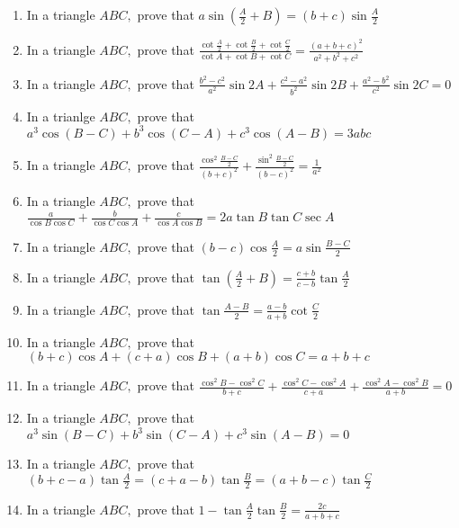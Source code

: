 \begin{enumerate}
\item In a triangle $ABC,$ prove that $a\sin\left(\frac{A}{2} + B\right) = (b + c)\sin\frac{A}{2}$

\item In a triangle $ABC,$ prove that $\frac{\cot\frac{A}{2} + \cot\frac{B}{2} + \cot\frac{C}{2}}{\cot A + \cot B + \cot
    C} = \frac{(a + b + c)^2}{a^2 + b^2 + c^2}$

\item In a triangle $ABC,$ prove that $\frac{b^2 - c^2}{a^2}\sin2A + \frac{c^2 - a^2}{b^2}\sin2B + \frac{a^2 -
    b^2}{c^2}\sin2C = 0$

\item In a trianlge $ABC,$ prove that $a^3\cos(B - C) + b^3\cos(C - A) + c^3\cos(A - B) = 3abc$

\item In a triangle $ABC,$ prove that $\frac{\cos^2\frac{B - C}{2}}{(b + c)^2} + \frac{\sin^2\frac{B - C}{2}}{(b - c)^2}
    = \frac{1}{a^2}$

\item In a triangle $ABC,$ prove that $\frac{a}{\cos B\cos C} + \frac{b}{\cos C\cos A} + \frac{c}{\cos A\cos B} = 2a\tan
    B\tan C\sec A$

\item In a triangle $ABC,$ prove that $(b - c)\cos\frac{A}{2} = a\sin\frac{B - C}{2}$

\item In a triangle $ABC,$ prove that $\tan\left(\frac{A}{2} + B\right) = \frac{c + b}{c - b}\tan \frac{A}{2}$

\item In a triangle $ABC,$ prove that $\tan\frac{A - B}{2} = \frac{a - b}{a + b}\cot\frac{C}{2}$

\item In a triangle $ABC,$ prove that $(b + c)\cos A + (c + a)\cos B + (a + b)\cos C = a + b + c$

\item In a triangle $ABC,$ prove that $\frac{\cos^2B - \cos^2C}{b + c} + \frac{\cos^2C - \cos^2A}{c + a} +
    \frac{\cos^2A - \cos^2B}{a + b} = 0$

\item In a triangle $ABC,$ prove that $a^3\sin(B - C) + b^3\sin(C - A) + c^3\sin(A - B) = 0$

\item In a triangle $ABC,$ prove that $(b + c - a)\tan\frac{A}{2} = (c + a - b)\tan\frac{B}{2} = (a + b -
    c)\tan\frac{C}{2}$

\item In a triangle $ABC,$ prove that $1 - \tan\frac{A}{2}\tan\frac{B}{2} = \frac{2c}{a + b + c}$


\end{enumerate}

